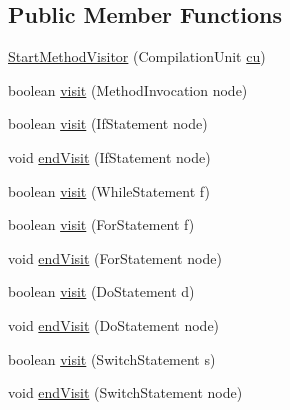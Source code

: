 \subsection*{Public Member Functions}
\begin{DoxyCompactItemize}
\item 
\hyperlink{classit_1_1isislab_1_1masonhelperdocumentation_1_1visitor_1_1_start_method_visitor_af45f59e21a3eeb126339f9c1e1f6f12b}{Start\-Method\-Visitor} (Compilation\-Unit \hyperlink{classit_1_1isislab_1_1masonhelperdocumentation_1_1visitor_1_1_start_method_visitor_a4111ccaff10a4938df4ff668149e92ad}{cu})
\item 
boolean \hyperlink{classit_1_1isislab_1_1masonhelperdocumentation_1_1visitor_1_1_start_method_visitor_a4895620b99a175f7aeba76ce34b67074}{visit} (Method\-Invocation node)
\item 
boolean \hyperlink{classit_1_1isislab_1_1masonhelperdocumentation_1_1visitor_1_1_start_method_visitor_a5be7baf0070dd887d174d852775cf47c}{visit} (If\-Statement node)
\item 
void \hyperlink{classit_1_1isislab_1_1masonhelperdocumentation_1_1visitor_1_1_start_method_visitor_aa53842f34598fd3a913561f796698539}{end\-Visit} (If\-Statement node)
\item 
boolean \hyperlink{classit_1_1isislab_1_1masonhelperdocumentation_1_1visitor_1_1_start_method_visitor_a8ca26fa2b0dcfaff30e6f299cdb9f965}{visit} (While\-Statement f)
\item 
boolean \hyperlink{classit_1_1isislab_1_1masonhelperdocumentation_1_1visitor_1_1_start_method_visitor_ac9fd4ee9633ac677f743f89c49ce5245}{visit} (For\-Statement f)
\item 
void \hyperlink{classit_1_1isislab_1_1masonhelperdocumentation_1_1visitor_1_1_start_method_visitor_af67d7e219b63b8aebb2748fb62ab32e3}{end\-Visit} (For\-Statement node)
\item 
boolean \hyperlink{classit_1_1isislab_1_1masonhelperdocumentation_1_1visitor_1_1_start_method_visitor_a72587e3598569c7446514c7c49c38c92}{visit} (Do\-Statement d)
\item 
void \hyperlink{classit_1_1isislab_1_1masonhelperdocumentation_1_1visitor_1_1_start_method_visitor_aaea1463f3412f6ba50498c2f04df3dfb}{end\-Visit} (Do\-Statement node)
\item 
boolean \hyperlink{classit_1_1isislab_1_1masonhelperdocumentation_1_1visitor_1_1_start_method_visitor_acea544584ca29d3df95a4c040a6b5bb1}{visit} (Switch\-Statement s)
\item 
void \hyperlink{classit_1_1isislab_1_1masonhelperdocumentation_1_1visitor_1_1_start_method_visitor_ad4d0ba39799c37b0cbf5911b70345126}{end\-Visit} (Switch\-Statement node)

\end{DoxyCompactItemize}

